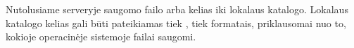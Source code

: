 \documentclass[letterpaper,10pt,lithuanian]{sphinxmanual}
\begin{document}
\begin{fulllineitems}

\pysigstartsignatures
{}
\pysigstopsignatures
\sphinxAtStartPar
Nutolusiame serveryje saugomo failo {\hyperref[\detokenize{savokos:term-URI}]{}} arba kelias iki lokalaus
katalogo. Lokalaus katalogo kelias gali būti pateikiamas tiek {\hyperref[\detokenize{savokos:term-POSIX}]{}},
tiek {\hyperref[\detokenize{savokos:term-DOS}]{}} formatais, priklausomai nuo to, kokioje operacinėje
sistemoje failai saugomi.

\end{fulllineitems}
\end{document}
